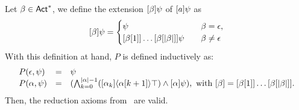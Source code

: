 \begin{proposition}\label{pro:srefaxioms}
Let $\beta \in {\rm \sf Act}^*$, we define the extension $[\beta]\psi$ of $[a]\psi$ as
\[
\mlbox{\beta} \psi = 
\begin{cases}
\psi &\quad \beta = \epsilon, \\
\mlbox{\beta[1]} \dots \mlbox{\beta[\card{\beta}]} \psi &\quad \beta \neq \epsilon \\
\end{cases}
\]
With this definition at hand, $P$ is defined inductively as: 
\[
    \begin{array}{lcl}
        P(\epsilon,\psi) & = & \psi \\
        P(\alpha,\psi)  &= &(\bigwedge_{k=0}^{|{\alpha}|-1}([\alpha_k]\langle \alpha[k+1] \rangle\top) \wedge [\alpha] \psi), \mbox{ with } [\beta] = [\beta[1]] \dots [\beta[|{\beta}|]]. 
    \end{array}
\]
Then, the reduction axioms from~ are valid.
\end{proposition}
